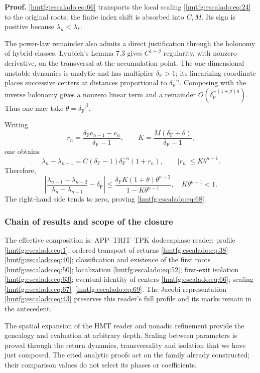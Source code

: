 \textbf{Proof.} \eqref{hmtfg:escalado:eq:66} transports the local scaling \eqref{hmtfg:escalado:eq:24} to the original roots; the finite index shift is absorbed into \(C,M\). Its sign is positive because \(\lambda_n<\lambda_*\).

The power-law remainder also admits a direct justification through the holonomy of hybrid classes. Lyubich’s Lemma 7.3 gives \(C^{1+\beta}\) regularity, with nonzero derivative, on the transversal at the accumulation point. The one-dimensional unstable dynamics is analytic and has multiplier \(\delta_{\mathrm F}>1\); its linearizing coordinate places successive centers at distances proportional to \(\delta_{\mathrm F}^{-n}\). Composing with the inverse holonomy gives a nonzero linear term and a remainder \(O(\delta_{\mathrm F}^{-(1+\beta)n})\). Thus one may take \(\theta=\delta_{\mathrm F}^{-\beta}\).

Writing
\[
r_n=\frac{\delta_{\mathrm F} e_{n-1}-e_n}{\delta_{\mathrm F}-1},
\qquad K=\frac{M(\delta_{\mathrm F}+\theta)}{\delta_{\mathrm F}-1},
\]
one obtains
\[
\lambda_n-\lambda_{n-1}
=C(\delta_{\mathrm F}-1)\delta_{\mathrm F}^{-n}(1+r_n),\qquad
|r_n|\le K\theta^{n-1}.
\]
Therefore,
\begin{equation}
\left|
\frac{\lambda_{n-1}-\lambda_{n-2}}
{\lambda_n-\lambda_{n-1}}-\delta_{\mathrm F}
\right|
\le
\frac{\delta_{\mathrm F} K(1+\theta)\theta^{n-2}}
{1-K\theta^{n-1}},
\quad K\theta^{n-1}<1.
\label{hmtfg:escalado:eq:69}
\end{equation}
The right-hand side tends to zero, proving \eqref{hmtfg:escalado:eq:68}.

\subsubsection{Chain of results and scope of the closure}
\label{hmtfg:escalado:17.4}

The effective composition is: APP–TRIT–TPK dodecaphase reader; profile \eqref{hmtfg:escalado:eq:1}; ordered transport of returns \eqref{hmtfg:escalado:eq:38}–\eqref{hmtfg:escalado:eq:40}; classification and existence of the first roots \eqref{hmtfg:escalado:eq:50}; localization \eqref{hmtfg:escalado:eq:52}; first-exit isolation \eqref{hmtfg:escalado:eq:63}; eventual identity of centers \eqref{hmtfg:escalado:eq:66}; scaling \eqref{hmtfg:escalado:eq:67}–\eqref{hmtfg:escalado:eq:69}. The Jacobi representation \eqref{hmtfg:escalado:eq:43} preserves this reader’s full profile and its marks remain in the antecedent.

The spatial expansion of the HMT reader and nonadic refinement provide the genealogy and evaluation at arbitrary depth. Scaling between parameters is proved through the return dynamics, transversality and isolation that we have just composed. The cited analytic proofs act on the family already constructed; their comparison values do not select its phases or coefficients.

